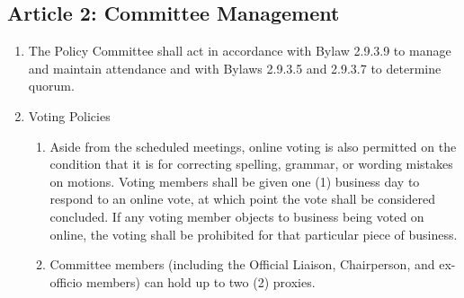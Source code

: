 \subsection{Article 2: Committee Management}
\begin{enumerate}[label*=\arabic*., align=left]	
\item The Policy Committee shall act in accordance with Bylaw 2.9.3.9 to manage and maintain
attendance and with Bylaws 2.9.3.5 and 2.9.3.7 to determine quorum.
\item Voting Policies
\begin{enumerate}[label*=\arabic*., align=left]	
\item Aside from the scheduled meetings, online voting is also permitted on the condition that it is for correcting spelling, grammar, or wording mistakes on motions. Voting members shall be given one (1) business day to respond to an online vote, at which point the vote shall be considered concluded. If any voting member objects to business being voted on online, the voting shall be prohibited for that particular piece of business.
\item Committee members (including the Official Liaison, Chairperson, and ex-officio members) can hold up to two (2) proxies.
\end{enumerate}
\end{enumerate}

